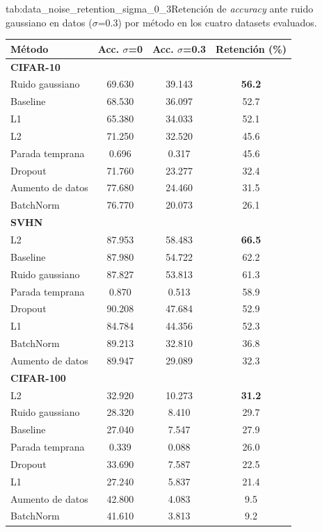 \begin{table}{tab:data_noise_retention_sigma_0_3}{Retención de \textit{accuracy} ante ruido gaussiano en datos ($\sigma$=0.3) por método en los cuatro datasets evaluados.}
\small
\begin{tabular}{lccc}
\toprule
\textbf{Método} & \textbf{Acc. $\sigma$=0} & \textbf{Acc. $\sigma$=0.3} & \textbf{Retención (\%)} \\
\midrule
\multicolumn{4}{l}{\textbf{CIFAR-10}}\\
\midrule
Ruido gaussiano & 69.630 & 39.143 & \textbf{56.2} \\
Baseline & 68.530 & 36.097 & 52.7 \\
L1 & 65.380 & 34.033 & 52.1 \\
L2 & 71.250 & 32.520 & 45.6 \\
Parada temprana & 0.696 & 0.317 & 45.6 \\
Dropout & 71.760 & 23.277 & 32.4 \\
Aumento de datos & 77.680 & 24.460 & 31.5 \\
BatchNorm & 76.770 & 20.073 & 26.1 \\
\midrule
\multicolumn{4}{l}{\textbf{SVHN}}\\
\midrule
L2 & 87.953 & 58.483 & \textbf{66.5} \\
Baseline & 87.980 & 54.722 & 62.2 \\
Ruido gaussiano & 87.827 & 53.813 & 61.3 \\
Parada temprana & 0.870 & 0.513 & 58.9 \\
Dropout & 90.208 & 47.684 & 52.9 \\
L1 & 84.784 & 44.356 & 52.3 \\
BatchNorm & 89.213 & 32.810 & 36.8 \\
Aumento de datos & 89.947 & 29.089 & 32.3 \\
\midrule
\multicolumn{4}{l}{\textbf{CIFAR-100}}\\
\midrule
L2 & 32.920 & 10.273 & \textbf{31.2} \\
Ruido gaussiano & 28.320 & 8.410 & 29.7 \\
Baseline & 27.040 & 7.547 & 27.9 \\
Parada temprana & 0.339 & 0.088 & 26.0 \\
Dropout & 33.690 & 7.587 & 22.5 \\
L1 & 27.240 & 5.837 & 21.4 \\
Aumento de datos & 42.800 & 4.083 & 9.5 \\
BatchNorm & 41.610 & 3.813 & 9.2 \\

\end{tabular}
\end{table}
